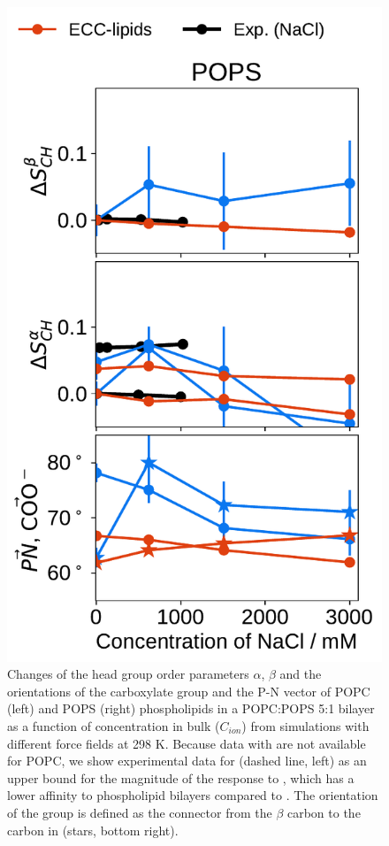 \documentclass[journal=jpcbfk,manuscript=article]{achemso}
\newlength{\figheight}
\begin{document}
\begin{figure}[tbp!]
  \includegraphics[height=\figheight]{../img/ecc_pops/order_parameters_changes_ecc-lip_L14_A-B-PN-COO_POPS_nacl.pdf} 
  \caption{\label{fig:delta_ordPar_NaCl_PCPS} 
    Changes of the head group order parameters $\alpha$, $\beta$ and the orientations of the carboxylate group and the P-N vector  
    of POPC (left) and POPS (right) phospholipids in a POPC:POPS 5:1 bilayer as a function of  concentration 
    in bulk ($C_{ion}$) from simulations with different force fields at 298 K.
    Because data with  are not available for POPC, 
    we show experimental data for  (dashed line, left) 
    as an upper bound for the magnitude of the response to , 
    which has a lower affinity to phospholipid bilayers compared to  \citep{roux90}. 
    The orientation of the  group is defined as 
    the connector from the $\beta$ carbon to the carbon in  (stars, bottom right). 
  }
  \end{figure} 
\end{document}
